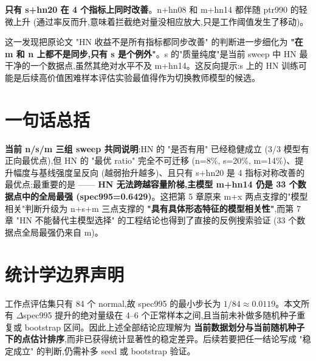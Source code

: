 \documentclass[UTF8,12pt,a4paper]{ctexart}
\begin{document}
\textbf{只有 s+hn20 在 4 个指标上同时改善}。n+hn08 和 m+hn14 都伴随 ptr990 的轻微上升 (通过率反而升,意味着拦截绝对量没相应放大,只是工作阈值发生了移动)。

这一发现把原论文 "HN 收益不是所有指标都同步改善" 的判断进一步细化为 \textbf{"在 m 和 n 上都不是同步,只有 s 是个例外"}。s 的"质量纯度"是当前 sweep 中 HN 最干净的一个数据点,虽然其绝对水平不及 m+hn14。这反向提示:s 上的 HN 训练可能是后续高价值困难样本评估实验最值得作为切换教师模型的候选。

\bigskip
\section*{一句话总括}

\noindent\textbf{当前 n/s/m 三组 sweep 共同说明}:HN 的 "是否有用" 已经稳健成立 (3/3 模型有正向最优点),但 HN 的 "最优 ratio" 完全不可迁移 (n=8\%, s=20\%, m=14\%)、提升幅度与基线强度呈反向 (越弱抬升越多)、且只有 s+hn20 是 4 指标对称改善的最优点;最重要的是 —— \textbf{HN 无法跨越容量阶梯,主模型 m+hn14 仍是 33 个数据点中的全局最强 (spec995=0.6429)}。这把第 5 章原来 m+x 两点支撑的"模型相关"判断升级为 n+s+m 三点支撑的 \textbf{"具有具体形态特征的模型相关性"},而第 7 章 "HN 不能替代主模型选择" 的工程结论也得到了直接的反例搜索验证 (33 个数据点全局最强仍来自 m)。

\bigskip
\section*{统计学边界声明}

工作点评估集只有 84 个 normal,故 spec995 的最小步长为 \(1/84 \approx 0.0119\)。本文所有 \(\Delta\)spec995 提升的绝对量级在 4--6 个正常样本之间,且当前未补做多随机种子重复或 bootstrap 区间。因此上述全部结论应理解为 \textbf{当前数据划分与当前随机种子下的点估计排序},而非已获得统计显著性的稳定差异。后续若要把任一结论写成 "稳定成立" 的判断,仍需补多 seed 或 bootstrap 验证。
\end{document}
